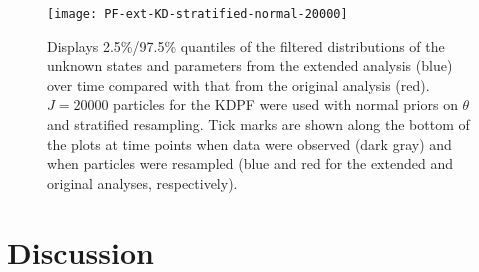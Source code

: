 \documentclass{elsarticle}
\begin{document}
\begin{figure}
\centering
\texttt{[image: PF-ext-KD-stratified-normal-20000]}
\caption{Displays 2.5\%/97.5\% quantiles of the filtered distributions of the unknown states and parameters from the extended analysis (blue) over time compared with that from the original analysis (red).  $J = 20000$ particles for the KDPF were used with normal priors on $\theta$ and stratified resampling.  Tick marks are shown along the bottom of the plots at time points when data were observed (dark gray) and when particles were resampled (blue and red for the extended and original analyses, respectively).} \label{fig:ext}
\end{figure}

\section{Discussion \label{sec:discussion}}

\clearpage



\end{document}

